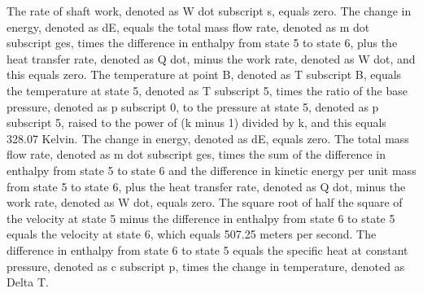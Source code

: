 The rate of shaft work, denoted as W dot subscript s, equals zero.
The change in energy, denoted as dE, equals the total mass flow rate, denoted as m dot subscript ges, times the difference in enthalpy from state 5 to state 6, plus the heat transfer rate, denoted as Q dot, minus the work rate, denoted as W dot, and this equals zero.
The temperature at point B, denoted as T subscript B, equals the temperature at state 5, denoted as T subscript 5, times the ratio of the base pressure, denoted as p subscript 0, to the pressure at state 5, denoted as p subscript 5, raised to the power of (k minus 1) divided by k, and this equals 328.07 Kelvin.
The change in energy, denoted as dE, equals zero.
The total mass flow rate, denoted as m dot subscript ges, times the sum of the difference in enthalpy from state 5 to state 6 and the difference in kinetic energy per unit mass from state 5 to state 6, plus the heat transfer rate, denoted as Q dot, minus the work rate, denoted as W dot, equals zero.
The square root of half the square of the velocity at state 5 minus the difference in enthalpy from state 6 to state 5 equals the velocity at state 6, which equals 507.25 meters per second.
The difference in enthalpy from state 6 to state 5 equals the specific heat at constant pressure, denoted as c subscript p, times the change in temperature, denoted as Delta T.